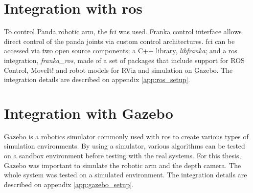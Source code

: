 


\section{Integration with \gls{ros}}
\label{sec:robotic_system_integration_ros}

To control Panda robotic arm, the \gls{fci} was used. Franka control interface allows direct control of the panda joints via custom control architectures. \gls{fci} can be accessed via two open source components: a C++ library, \textit{libfranka}; and a \gls{ros} integration, \textit{franka\_ros}, made of a set of packages that include support for ROS Control, MoveIt! and robot models for RViz and simulation on Gazebo. The integration details are described on appendix \ref{app:ros_setup}.



\section{Integration with Gazebo}
\label{sec:robotic_system_integration_gazebo}

Gazebo is a robotics simulator commonly used with \gls{ros} to create various types of simulation environments. By using a simulator, various algorithms can be tested on a sandbox environment before testing with the real systems. For this thesis, Gazebo was important to simulate the robotic arm and the depth camera. The whole system was tested on a simulated environment. The integration details are described on appendix \ref{app:gazebo_setup}.

